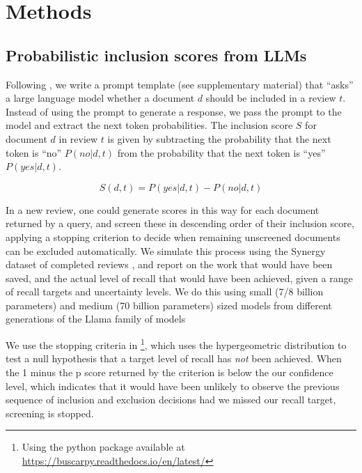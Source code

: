 \documentclass{article}
\begin{document}
	\section*{Methods}
	
	\subsection*{Probabilistic inclusion scores from LLMs}
	
	Following \cite{wang_zero-shot_2024}, we write a prompt template (see supplementary material) that ``asks'' a large language model whether a document $d$ should be included in a review $t$. Instead of using the prompt to generate a response, we pass the prompt to the model and extract the next token probabilities. The inclusion score $S$ for document $d$ in review $t$ is given by subtracting the probability that the next token is ``no'' $P(no|d,t)$ from the probability that the next token is ``yes'' $P(yes|d,t)$.
	
	\begin{equation}S(d,t) = P(yes|d,t) - P(no|d,t)\end{equation}
	
	In a new review, one could generate scores in this way for each document returned by a query, and screen these in descending order of their inclusion score, applying a stopping criterion to decide when remaining unscreened documents can be excluded automatically.  We simulate this process using the Synergy dataset of completed reviews \cite{de_bruin_synergy_2023}, and report on the work that would have been saved, and the actual level of recall that would have been achieved, given a range of recall targets and uncertainty levels. We do this using small (7/8 billion parameters) and medium (70 billion parameters) sized models from different generations of the Llama family of models \cite{touvron_llama_2023, dubey_llama_2024}
	
	We use the stopping criteria in \cite{callaghan_statistical_2020}\footnote{Using the python package available at \url{https://buscarpy.readthedocs.io/en/latest/}}, which uses the hypergeometric distribution to test a null hypothesis that a target level of recall has \textit{not} been achieved. When the 1 minus the p score returned by the criterion is below the our confidence level, which indicates that it would have been unlikely to observe the previous sequence of inclusion and exclusion decisions had we missed our recall target, screening is stopped. 
	
\end{document}
